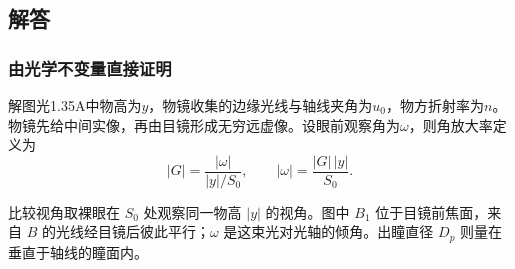 \documentclass[UTF8,fontset=fandol,a4paper,11pt]{ctexart}
\begin{document}
\subsection*{解答}


\subsubsection*{由光学不变量直接证明}
解图光1.35A中物高为$y$，物镜收集的边缘光线与轴线夹角为$u_0$，物方折射率为$n$。物镜先给中间实像，再由目镜形成无穷远虚像。设眼前观察角为$\omega$，则角放大率定义为
\[
|G|=\frac{|\omega|}{|y|/S_0},
\qquad
|\omega|=\frac{|G|\,|y|}{S_0}.
\]

比较视角取裸眼在 $S_0$ 处观察同一物高 $|y|$ 的视角。图中 $B_1$ 位于目镜前焦面，来自 $B$ 的光线经目镜后彼此平行；$\omega$ 是这束光对光轴的倾角。出瞳直径 $D_p$ 则量在垂直于轴线的瞳面内。
\end{document}
